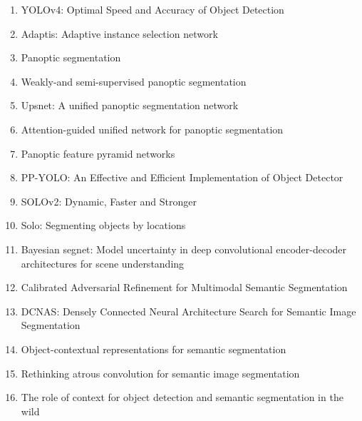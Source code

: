 \documentclass[acmlarge]{acmart}
\begin{document}
\begin{enumerate}
	\item YOLOv4: Optimal Speed and Accuracy of Object Detection \cite{bochkovskiy2020yolov4} 

	\item Adaptis: Adaptive instance selection network \cite{sofiiuk2019adaptis} 

	\item Panoptic segmentation \cite{kirillov2019panoptic} 

	\item Weakly-and semi-supervised panoptic segmentation \cite{li2018weakly} 

	\item Upsnet: A unified panoptic segmentation network \cite{xiong2019upsnet} 

	\item Attention-guided unified network for panoptic segmentation \cite{li2019attention} 

	\item Panoptic feature pyramid networks \cite{kirillov2019panoptic} 

	\item PP-YOLO: An Effective and Efficient Implementation of Object Detector \cite{long2020pp} 

	\item SOLOv2: Dynamic, Faster and Stronger \cite{wang2020solov2} 

	\item Solo: Segmenting objects by locations \cite{wang2019solo} 

	\item Bayesian segnet: Model uncertainty in deep convolutional encoder-decoder architectures for scene understanding \cite{kendall2015bayesian} 

	\item Calibrated Adversarial Refinement for Multimodal Semantic Segmentation \cite{kassapis2020calibrated} 

	\item DCNAS: Densely Connected Neural Architecture Search for Semantic Image Segmentation \cite{zhang2020dcnas} 

	\item Object-contextual representations for semantic segmentation \cite{yuan2019object} 

	\item Rethinking atrous convolution for semantic image segmentation \cite{chen2017rethinking} 

	\item The role of context for object detection and semantic segmentation in the wild \cite{mottaghi2014role} 


\end{enumerate}
\end{document}
